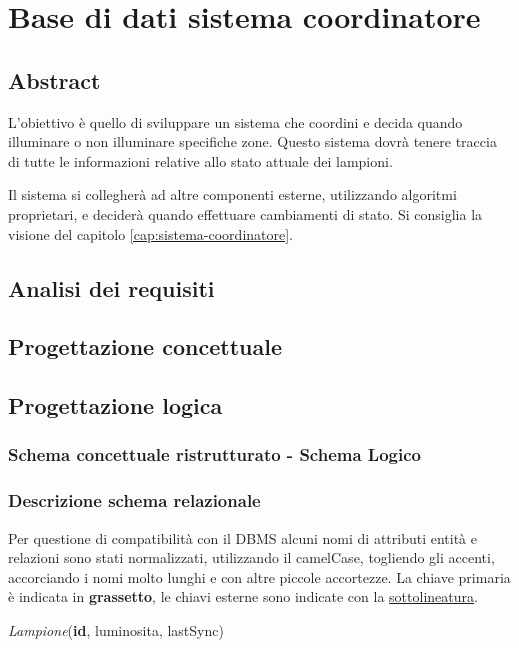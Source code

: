 \section{Base di dati sistema coordinatore}

\subsection{Abstract}

L'obiettivo è quello di sviluppare un sistema che coordini e decida quando illuminare o non illuminare specifiche zone. Questo sistema dovrà tenere traccia di tutte le informazioni relative allo stato attuale dei lampioni.

Il sistema si collegherà ad altre componenti esterne, utilizzando algoritmi proprietari, e deciderà quando effettuare cambiamenti di stato. Si consiglia la visione del capitolo \ref{cap:sistema-coordinatore}.


\subsection{Analisi dei requisiti}

\subsection{Progettazione concettuale}

\subsection{Progettazione logica}

\subsubsection{Schema concettuale ristrutturato - Schema Logico}

\subsubsection{Descrizione schema relazionale}

Per questione di compatibilità con il DBMS alcuni nomi di attributi entità e relazioni sono stati normalizzati, utilizzando il camelCase, togliendo gli accenti, accorciando i nomi molto lunghi e con altre piccole accortezze.
La chiave primaria è indicata in \textbf{grassetto}, le chiavi esterne sono indicate con la \underline{sottolineatura}.

\textit{Lampione}(\textbf{id}, luminosita, lastSync)